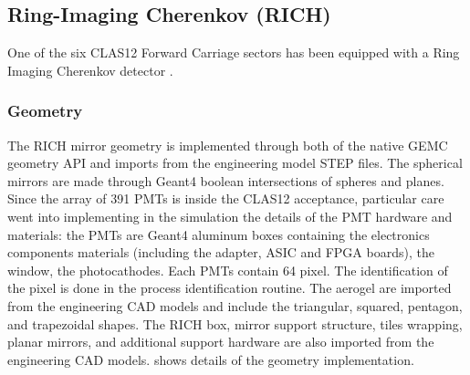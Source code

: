 \subsection{Ring-Imaging Cherenkov (RICH)}

One of the six CLAS12 Forward Carriage sectors has been equipped with a Ring Imaging Cherenkov detector \cite{rich-nim}.

\subsubsection{Geometry}
The RICH mirror geometry is implemented through both of the native GEMC geometry API and imports from the engineering model STEP files.
The spherical mirrors are made through Geant4 boolean intersections of spheres and planes.
Since the array of 391 PMTs is inside the CLAS12 acceptance, particular care went into implementing in the
simulation the details of the PMT hardware and materials: the PMTs are Geant4 aluminum boxes containing the electronics components materials
(including the adapter, ASIC and FPGA boards), the window, the photocathodes.
Each PMTs contain 64 pixel. The identification of the pixel is done in the process identification routine.
The aerogel are imported from the engineering CAD models and include the triangular, squared, pentagon, and trapezoidal shapes.
The RICH box, mirror support structure, tiles wrapping, planar mirrors, and additional support hardware are also imported from the engineering CAD models.
 shows details of the geometry implementation.

